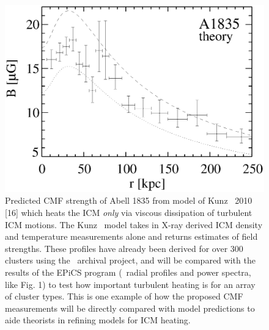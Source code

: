 \begin{figure}
  \begin{center}
    \begin{minipage}{\linewidth}
      \includegraphics*[width=\linewidth, trim=10mm 4mm 2mm 5mm, clip]{kunz.eps}
    \end{minipage}
    \caption{Predicted CMF strength of Abell 1835 from model of Kunz
      \etal\ 2010 [16] which heats the ICM {\it{only}} via viscous
      dissipation of turbulent ICM motions. The Kunz \etal\ model
      takes in X-ray derived ICM density and temperature measurements
      alone and returns estimates of field strengths. These profiles
      have already been derived for over 300 clusters using the
      \chandra\ archival project, and will be compared with the
      results of the EPiCS program (\eg\ radial profiles and power
      spectra, like Fig. 1) to test how important turbulent heating is
      for an array of cluster types. This is one example of how the
      proposed CMF measurements will be directly compared with model
      predictions to aide theorists in refining models for ICM
      heating.}
  \end{center}
\end{figure}
